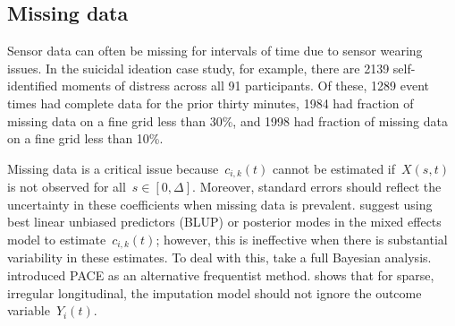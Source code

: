 \documentclass[12pt]{amsart}
\begin{document}
\subsection{Missing data}
\label{section:missingdata}

Sensor data can often be missing for intervals of time due to sensor wearing issues. In the suicidal ideation case study, for example, there are 2139 self-identified moments of distress across all 91 participants. Of these, 1289 event times had complete data for the prior thirty minutes, 1984 had fraction of missing data on a fine grid less than 30\%, and 1998 had fraction of missing data on a fine grid less than 10\%.

Missing data is a critical issue because~$c_{i,k} (t)$ cannot be estimated if~$X(s,t)$ is not observed for all~$s \in [0,\Delta]$. Moreover, standard errors should reflect the uncertainty in these coefficients when missing data is prevalent. \cite{Goldsmith2011} suggest using best linear unbiased predictors (BLUP) or posterior modes in the mixed effects model to estimate~$c_{i,k} (t)$; however, this is ineffective when there is substantial variability in these estimates.  To deal with this, \cite{Crainiceanu2010} take a full Bayesian analysis. \cite{Yao2005} introduced PACE as an alternative frequentist method. \cite{Petrovich2018} shows that for sparse, irregular longitudinal, the imputation model should not ignore the outcome variable~$Y_i (t)$.
\end{document}
